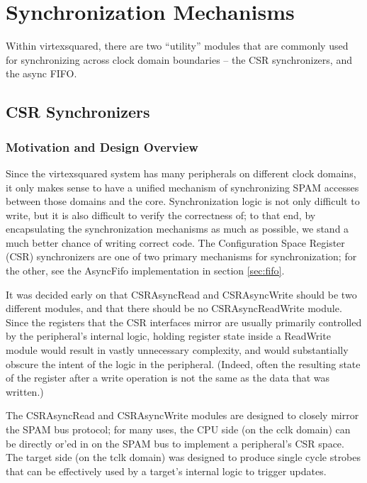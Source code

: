 \documentclass[10pt]{report}
\begin{document}
\section{Synchronization Mechanisms}

\label{sec:sync}

Within virtexsquared, there are two ``utility'' modules that are commonly
used for synchronizing across clock domain boundaries -- the CSR
synchronizers, and the async FIFO.

\subsection{CSR Synchronizers}

\label{sec:csrasync}

\subsubsection{Motivation and Design Overview}

Since the virtexsquared system has many peripherals on different clock
domains, it only makes sense to have a unified mechanism of synchronizing
SPAM accesses between those domains and the core. Synchronization logic is
not only difficult to write, but it is also difficult to verify the
correctness of; to that end, by encapsulating the synchronization mechanisms
as much as possible, we stand a much better chance of writing correct code.
The Configuration Space Register (CSR) synchronizers are one of two primary
mechanisms for synchronization; for the other, see the AsyncFifo
implementation in section \ref{sec:fifo}.

It was decided early on that CSRAsyncRead and CSRAsyncWrite should be two
different modules, and that there should be no CSRAsyncReadWrite module.
Since the registers that the CSR interfaces mirror are usually primarily
controlled by the peripheral's internal logic, holding register state inside
a ReadWrite module would result in vastly unnecessary complexity, and would
substantially obscure the intent of the logic in the peripheral. (Indeed,
often the resulting state of the register after a write operation is not the
same as the data that was written.)

The CSRAsyncRead and CSRAsyncWrite modules are designed to closely mirror
the SPAM bus protocol; for many uses, the CPU side (on the cclk domain) can
be directly or'ed in on the SPAM bus to implement a peripheral's CSR space.
The target side (on the tclk domain) was designed to produce single cycle
strobes that can be effectively used by a target's internal logic to trigger
updates.
\end{document}
